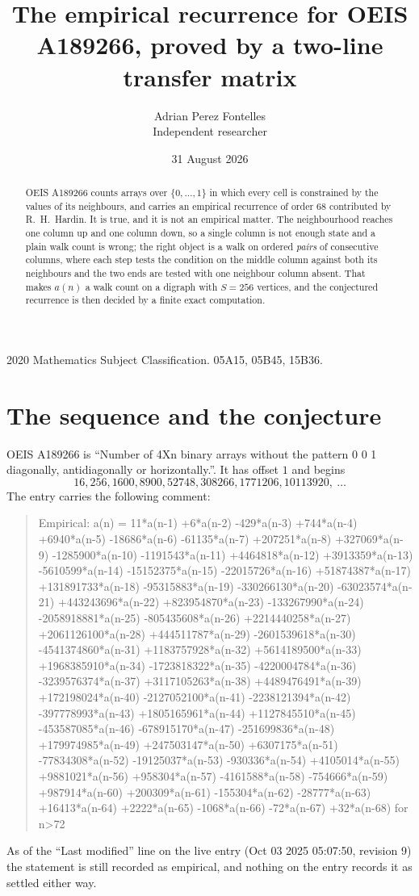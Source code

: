 \documentclass[11pt,a4paper]{article}
\title{The empirical recurrence for OEIS A189266, proved by a two-line transfer matrix}
\author{Adrian Perez Fontelles\\ \small Independent researcher}
\date{31 August 2026}
\theoremstyle{plain}
\theoremstyle{definition}
\begin{document}
\maketitle

\begin{abstract}
OEIS A189266 counts arrays over $\{0,\dots,1\}$ in which every cell is constrained by the
values of its neighbours, and carries an empirical recurrence of order $68$ contributed
by R.~H.~Hardin. It is true, and it is not an empirical matter. The neighbourhood reaches one
column up and one column down, so a single column is not enough state and a plain walk count
is wrong; the right object is a walk on ordered \emph{pairs} of consecutive columns, where
each step tests the condition on the middle column against both its neighbours and the two
ends are tested with one neighbour column absent. That makes $a(n)$ a walk count on a digraph
with $S=256$ vertices, and the conjectured recurrence is then decided by a finite exact
computation.
\end{abstract}

\noindent\small 2020 Mathematics Subject Classification. 05A15, 05B45, 15B36.\normalsize

\section{The sequence and the conjecture}

OEIS A189266 is ``Number of 4Xn binary arrays without the pattern 0 0 1 diagonally, antidiagonally or horizontally.''. It has offset $1$ and begins
\[
16, 256, 1600, 8900, 52748, 308266, 1771206, 10113920,\ \dots
\]
The entry carries the following comment:
\begin{quote}\small
Empirical: a(n) = 11*a(n-1) +6*a(n-2) -429*a(n-3) +744*a(n-4) +6940*a(n-5) -18686*a(n-6) -61135*a(n-7) +207251*a(n-8) +327069*a(n-9) -1285900*a(n-10) -1191543*a(n-11) +4464818*a(n-12) +3913359*a(n-13) -5610599*a(n-14) -15152375*a(n-15) -22015726*a(n-16) +51874387*a(n-17) +131891733*a(n-18) -95315883*a(n-19) -330266130*a(n-20) -63023574*a(n-21) +443243696*a(n-22) +823954870*a(n-23) -133267990*a(n-24) -2058918881*a(n-25) -805435608*a(n-26) +2214440258*a(n-27) +2061126100*a(n-28) +444511787*a(n-29) -2601539618*a(n-30) -4541374860*a(n-31) +1183757928*a(n-32) +5614189500*a(n-33) +1968385910*a(n-34) -1723818322*a(n-35) -4220004784*a(n-36) -3239576374*a(n-37) +3117105263*a(n-38) +4489476491*a(n-39) +172198024*a(n-40) -2127052100*a(n-41) -2238121394*a(n-42) -397778993*a(n-43) +1805165961*a(n-44) +1127845510*a(n-45) -453587085*a(n-46) -678915170*a(n-47) -251699836*a(n-48) +179974985*a(n-49) +247503147*a(n-50) +6307175*a(n-51) -77834308*a(n-52) -19125037*a(n-53) -930336*a(n-54) +4105014*a(n-55) +9881021*a(n-56) +958304*a(n-57) -4161588*a(n-58) -754666*a(n-59) +987914*a(n-60) +200309*a(n-61) -155304*a(n-62) -28777*a(n-63) +16413*a(n-64) +2222*a(n-65) -1068*a(n-66) -72*a(n-67) +32*a(n-68) for n>72
\end{quote}
As of the ``Last modified'' line on the live entry (Oct 03 2025 05:07:50, revision 9) the statement is
still recorded as empirical, and nothing on the entry records it as settled either way.
\end{document}
